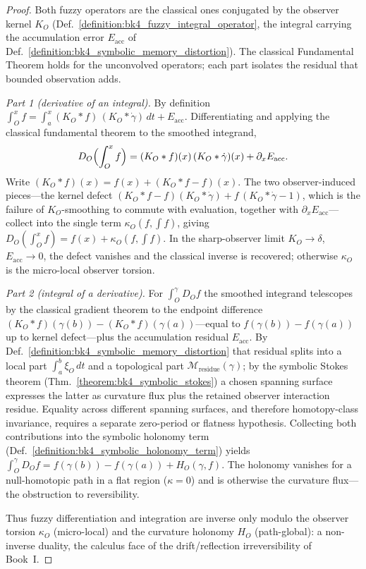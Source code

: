 \begin{proof}
\label{proof:bk4_fuzzy_fundamental}
\leavevmode
Both fuzzy operators are the classical ones conjugated by the observer kernel $K_O$ (Def.~\ref{definition:bk4_fuzzy_integral_operator}, the integral carrying the accumulation error $E_{\text{acc}}$ of Def.~\ref{definition:bk4_symbolic_memory_distortion}). The classical Fundamental Theorem holds for the unconvolved operators; each part isolates the residual that bounded observation adds.

\emph{Part 1 (derivative of an integral).} By definition $\int_O^x f = \int_a^x (K_O*f)\,(K_O*\dot\gamma)\,dt + E_{\text{acc}}$. Differentiating and applying the classical fundamental theorem to the smoothed integrand,
\[
D_O\Bigl(\int_O^x f\Bigr) = (K_O*f)(x)\,(K_O*\dot\gamma)(x) + \partial_x E_{\text{acc}}.
\]
Write $(K_O*f)(x) = f(x) + (K_O*f - f)(x)$. The two observer-induced pieces---the kernel defect $(K_O*f-f)(K_O*\dot\gamma) + f\,(K_O*\dot\gamma - 1)$, which is the failure of $K_O$-smoothing to commute with evaluation, together with $\partial_x E_{\text{acc}}$---collect into the single term $\kappa_O(f,\int f)$, giving $D_O(\int_O^x f) = f(x) + \kappa_O(f,\int f)$. In the sharp-observer limit $K_O \to \delta$, $E_{\text{acc}} \to 0$, the defect vanishes and the classical inverse is recovered; otherwise $\kappa_O$ is the micro-local observer torsion.

\emph{Part 2 (integral of a derivative).} For $\int_O^\gamma D_O f$ the smoothed integrand telescopes by the classical gradient theorem to the endpoint difference $(K_O*f)(\gamma(b)) - (K_O*f)(\gamma(a))$---equal to $f(\gamma(b)) - f(\gamma(a))$ up to kernel defect---plus the accumulation residual $E_{\text{acc}}$. By Def.~\ref{definition:bk4_symbolic_memory_distortion} that residual splits into a local part $\int_a^b \xi_O\,dt$ and a topological part $\mathcal{M}_{\text{residue}}(\gamma)$; by the symbolic Stokes theorem (Thm.~\ref{theorem:bk4_symbolic_stokes}) a chosen spanning surface expresses the latter as curvature flux plus the retained observer interaction residue. Equality across different spanning surfaces, and therefore homotopy-class invariance, requires a separate zero-period or flatness hypothesis. Collecting both contributions into the symbolic holonomy term (Def.~\ref{definition:bk4_symbolic_holonomy_term}) yields $\int_O^\gamma D_O f = f(\gamma(b)) - f(\gamma(a)) + H_O(\gamma,f)$. The holonomy vanishes for a null-homotopic path in a flat region ($\kappa = 0$) and is otherwise the curvature flux---the obstruction to reversibility.

Thus fuzzy differentiation and integration are inverse only modulo the observer torsion $\kappa_O$ (micro-local) and the curvature holonomy $H_O$ (path-global): a non-inverse duality, the calculus face of the drift/reflection irreversibility of Book~I.
\end{proof}

